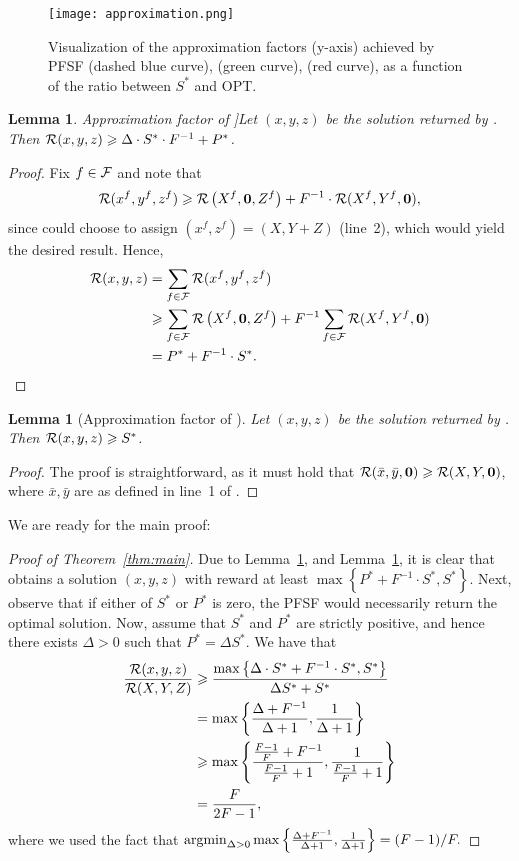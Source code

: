 \documentclass[conference]{IEEEtran}
\newtheorem{lemma}[theorem]{Lemma}
\begin{document}
\begin{figure}[!ht]
    \centering
    \texttt{[image: approximation.png]}
    \caption{Visualization of the approximation factors (y-axis) achieved by PFSF (dashed blue curve), \private (green curve), \shared (red curve), as a function of the ratio between $S^*$ and OPT.}
    \label{fig:approximation}
\end{figure}


\begin{lemma}Approximation factor of \private]\label{lem:private}
  Let $(x,y,z)$ be the solution returned by \private. Then $\mathcal{R}(x,y,z)\geqslant \Delta\cdot  S^*\cdot F^{-1}+P^*$.
\end{lemma}
\begin{proof}
  Fix $f\in \mathcal{F}$ and note that
  \[\mathcal{R}(x^f,y^f,z^f) \geqslant \mathcal{R}\left({X}^f,\bm{0},{Z}^f\right)+F^{-1}\cdot \mathcal{R}(X^f,Y^f,\bm{0}),\]
  since \private could choose to assign $(x^f,z^f)=(X,Y+Z)$ (line~2), which would yield the desired result. Hence,
\begin{align*}
  \mathcal{R}(x,y,z)&=\sum_{f\in \mathcal{F}}\mathcal{R}(x^f,y^f,z^f)\\ & \geqslant  \sum_{f\in \mathcal{F}}\mathcal{R}\left({X}^f,\bm{0},{Z}^f\right)+F^{-1}\sum_{f\in \mathcal{F}}\mathcal{R} (X^f,Y^f,\bm{0}) \\ 
& =P^* + F^{-1}\cdot S^*.
\end{align*}
\end{proof}

\begin{lemma}[Approximation factor of \shared]\label{lem:shared}
  Let $(x,y,z)$ be the solution returned by \shared. Then $\mathcal{R}(x,y,z)\geqslant S^*$.
\end{lemma}
\begin{proof}
  The proof is straightforward, as it must hold that $\mathcal{R}(\bar{x},\bar{y},\bm{0})\geqslant \mathcal{R}(X,Y,\bm{0})$, where $\bar{x},\bar{y}$ are as defined in line~1 of \shared.
\end{proof}

We are ready for the main proof:
\begin{proof}[Proof of Theorem~\ref{thm:main}]
Due to Lemma~\ref{lem:private}, and Lemma~\ref{lem:shared}, it is clear that \alg obtains a solution $(x,y,z)$ with reward at least $\max\left\{P^*+F^{-1}\cdot S^*,S^*\right\}$. Next, observe that if either of $S^*$ or $P^*$ is zero, the PFSF would necessarily return the optimal solution. Now, assume that $S^*$ and $P^*$ are strictly positive, and hence there exists $\Delta>0$ such that $P^*=\Delta S^*$. 
We have that 
\begin{align*}
    \frac{\mathcal{R}(x,y,z)}{\mathcal{R}(X,Y,Z)} & \geqslant \frac{\max\left\{\Delta\cdot S^*+F^{-1}\cdot S^*,S^*\right\}}{\Delta S^*+S^*} \\ & 
    = \max\left\{\frac{\Delta+F^{-1}}{\Delta +1},\frac{1}{\Delta+1}\right\}\\ 
    & \geqslant 
    \max\left\{\frac{\frac{F-1}{F}+F^{-1}}{\frac{F-1}{F} +1},\frac{1}{\frac{F-1}{F}+1}\right\}\\ & = \frac{F}{2F-1},
\end{align*}
where we used the fact that $\argmin_{\Delta>0}\max\left\{\frac{\Delta+F^{-1}}{\Delta +1},\frac{1}{\Delta+1}\right\}=(F-1)/F.$
\end{proof}
\end{document}
